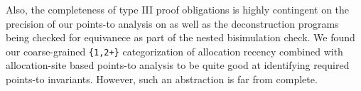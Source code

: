 Also, the completeness of type III proof obligations is highly contingent on the precision
of our points-to analysis on \cprog{} as well as the deconstruction programs being
checked for equivanece as part of the nested bisimulation check.
We found our coarse-grained {\tt \{1,2+\}} categorization of allocation recency
combined with allocation-site based points-to analysis to be quite good at
identifying required points-to invariants.
However, such an abstraction is far from complete.